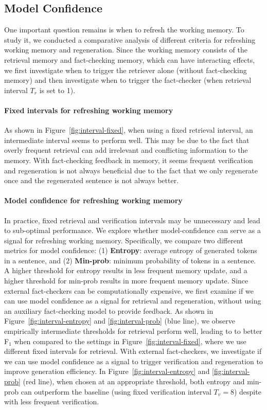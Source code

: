 \subsection{Model Confidence}




One important question remains is when to refresh the working memory. To study it, we conducted a comparative analysis of different criteria for refreshing working memory and regeneration. 
Since the working memory consists of the retrieval memory and fact-checking memory, which can have interacting effects, we first investigate when to trigger the retriever alone (without fact-checking memory) and then investigate when to trigger the fact-checker (when retrieval interval $T_r$ is set to 1).

\paragraph{Fixed intervals for refreshing working memory}
As shown in Figure~\ref{fig:interval-fixed}, when using a fixed retrieval interval, an intermediate interval seems to perform well. 
This may be due to the fact that overly frequent retrieval can add irrelevant and conflicting information to the memory. 
With fact-checking feedback in memory, it seems frequent verification and regeneration is not always beneficial due to the fact that we only regenerate once and the regenerated sentence is not always better.

\paragraph{Model confidence for refreshing working memory}
In practice, fixed retrieval and verification intervals may be unnecessary and lead to sub-optimal performance. We explore whether model-confidence can serve as a signal for refreshing working memory. Specifically, we compare two different metrics for model confidence: (1) \textbf{Entropy}: average entropy of generated tokens in a sentence, and (2) \textbf{Min-prob}: minimum probability of tokens in a sentence. A higher threshold for entropy results in less frequent memory update, and a higher threshold for min-prob results in more frequent memory update. 
Since external fact-checkers can be computationally expensive, we first examine if we can use model confidence as a signal for retrieval and regeneration, without using an auxiliary fact-checking model to provide feedback. 
As shown in Figure~\ref{fig:interval-entropy} and \ref{fig:interval-prob} (blue line), we observe empirically intermediate thresholds for retrieval perform well, leading to to better F$_1$ when compared to the settings in Figure~\ref{fig:interval-fixed}, where we use different fixed intervals for retrieval. 
With external fact-checkers, we investigate if we can use model confidence as a signal to trigger verification and regeneration to improve generation efficiency. 
In Figure~\ref{fig:interval-entropy} and \ref{fig:interval-prob} (red line), when chosen at an appropriate threshold, both entropy and min-prob can outperform the baseline (using fixed verification interval $T_v=8$) despite with less frequent verification.



